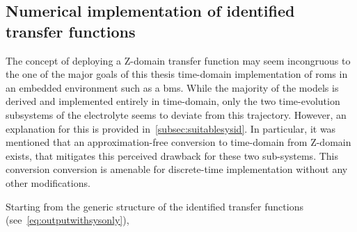 

\subsection{Numerical implementation of identified transfer functions}\label{subsec:sysidnumericalimpl}

The  concept of  deploying a  Z-domain  transfer function  may seem  incongruous
to   the  one   of  the   major  goals   of  this   thesis  \viz{}   time-domain
implementation of  \glspl{rom} in an  embedded environment such as  a \gls{bms}.
While  the  majority of  the  models  is  derived  and implemented  entirely  in
time-domain, only  the two  time-evolution subsystems  of the  electrolyte seems
to  deviate  from   this  trajectory.  However,  an  explanation   for  this  is
provided in~\cref{subsec:suitablesysid}.  In particular,  it was  mentioned that
an  approximation-free  conversion to  time-domain  from  Z-domain exists,  that
mitigates this  perceived drawback  for these  two sub-systems.  This conversion
conversion  is  amenable  for  discrete-time implementation  without  any  other
modifications.

Starting from the generic structure of the identified transfer functions (see~\cref{eq:outputwithsysonly}),

